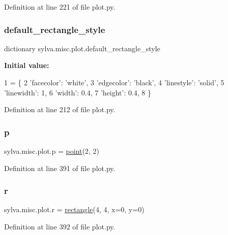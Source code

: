 Definition at line 221 of file plot.\+py.

\mbox{\label{namespacesylva_1_1misc_1_1plot_a9d341463b25190ccc0193e07c697648f}} 
\subsubsection{\texorpdfstring{default\+\_\+rectangle\+\_\+style}{default\_rectangle\_style}}
{\footnotesize\ttfamily dictionary sylva.\+misc.\+plot.\+default\+\_\+rectangle\+\_\+style}

{\bfseries Initial value\+:}
\begin{DoxyCode}
1 =  \{
2         \textcolor{stringliteral}{'facecolor'}: \textcolor{stringliteral}{'white'},
3         \textcolor{stringliteral}{'edgecolor'}: \textcolor{stringliteral}{'black'},
4         \textcolor{stringliteral}{'linestyle'}: \textcolor{stringliteral}{'solid'},
5         \textcolor{stringliteral}{'linewidth'}: 1,
6         \textcolor{stringliteral}{'width'}: 0.4,
7         \textcolor{stringliteral}{'height'}: 0.4,
8     \}
\end{DoxyCode}


Definition at line 212 of file plot.\+py.

\mbox{\label{namespacesylva_1_1misc_1_1plot_a0cda7def12ec7fe347a18675bc3f3ead}} 
\subsubsection{\texorpdfstring{p}{p}}
{\footnotesize\ttfamily sylva.\+misc.\+plot.\+p = \hyperlink{classsylva_1_1misc_1_1plot_1_1point}{point}(2, 2)}



Definition at line 391 of file plot.\+py.

\mbox{\label{namespacesylva_1_1misc_1_1plot_a620aa90142604ebb167426bcbd31acb1}} 
\subsubsection{\texorpdfstring{r}{r}}
{\footnotesize\ttfamily sylva.\+misc.\+plot.\+r = \hyperlink{classsylva_1_1misc_1_1plot_1_1rectangle}{rectangle}(4, 4, x=0, y=0)}



Definition at line 392 of file plot.\+py.

